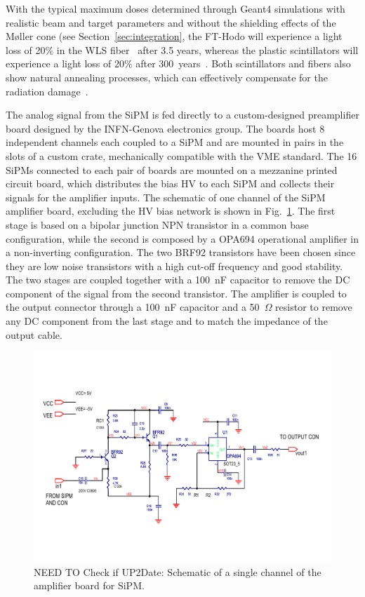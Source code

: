 With the typical maximum doses determined through Geant4 simulations with realistic beam and target parameters
and without the shielding effects of the M{\o}ller cone (see Section~\ref{sec:integration}, the FT-Hodo will
experience a light loss of 20\% in the WLS fiber~\cite{ft-tdr} after 3.5 years, whereas the plastic scintillators will
experience a light loss of 20\% after 300~years~\cite{ft-tdr}. Both scintillators and fibers also show natural
annealing processes, which can effectively compensate for the radiation damage~\cite{ft-tdr}.  

The analog signal from the SiPM is fed directly to a custom-designed preamplifier board designed by the
INFN-Genova electronics group. The boards host 8 independent channels each coupled to a SiPM and are mounted
in pairs in the slots of a custom crate, mechanically compatible with the VME standard. The 16 SiPMs connected to
each pair of boards are mounted on a mezzanine printed circuit board, which distributes the bias HV to each SiPM
and collects their signals for the amplifier inputs. The schematic of one channel of the SiPM amplifier board,
excluding the HV bias network is shown in Fig.~\ref{Fig:FTHODOAmpBoard}. The first stage is based on a bipolar
junction NPN transistor in a common base configuration, while the second is composed by a OPA694 operational
amplifier in a non-inverting configuration. The two BRF92 transistors have been chosen since they are low noise
transistors with a high cut-off frequency and good stability. The two stages are coupled together with a 100~nF
capacitor to remove the DC component of the signal from the second transistor. The amplifier is coupled to the
output connector through a 100~nF capacitor and a 50~$\Omega$ resistor to remove any DC component from the
last stage and to match the impedance of the output cable. 

\begin{figure}[th!]
\centering 
\includegraphics[width=0.95\columnwidth]{./fig/FTHODOAmpBoard.pdf} 
\caption{NEED TO Check if UP2Date: Schematic of a single channel of the amplifier board for SiPM.} 
\label{Fig:FTHODOAmpBoard} 
\end{figure}


